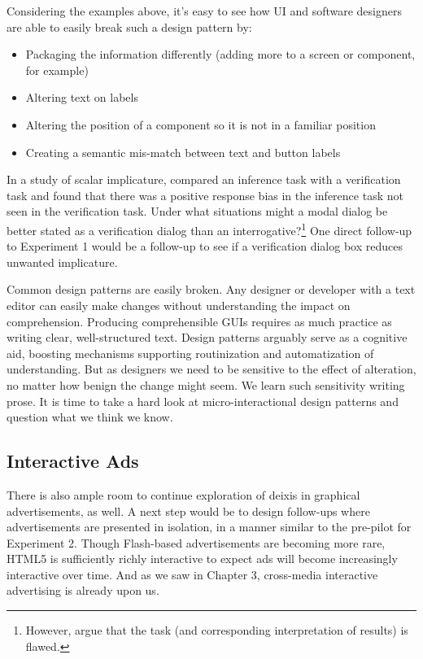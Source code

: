 Considering the examples above, it's easy to see how UI and software designers are able to easily break such a design pattern by:

\begin{itemize}
\item Packaging the information differently (adding more to a screen or component, for example)
\item Altering text on labels
\item Altering the position of a component so it is not in a familiar position
\item Creating a semantic mis-match between text and button labels
\end{itemize}

In a study of scalar implicature,  \citet*{Geurts:2009fw}  compared an inference task with a verification task and found that there was a positive response bias in the inference task not seen in the verification task. Under what situations might a modal dialog be better stated as a verification dialog than an  interrogative?\footnote{However, \citep{CliftonJr:2010dt} argue that the \citet{Geurts:2009fw} task (and corresponding interpretation of results) is flawed.}  One direct follow-up to Experiment 1 would be a follow-up to see if a verification dialog box reduces unwanted implicature.

Common design patterns are easily broken. Any designer or developer with a text editor can easily make changes without understanding the impact on comprehension. Producing comprehensible GUIs requires as much practice as writing clear, well-structured text. Design patterns arguably serve as a cognitive aid, boosting mechanisms supporting routinization and automatization of understanding. But as designers we need to be sensitive to the effect of alteration, no matter how benign the change might seem. We learn such sensitivity writing prose. It is time to take a hard look at micro-interactional design patterns and question what we think we know.

\subsection{Interactive Ads}
\label{interactiveads}

There is also ample room to continue exploration of deixis in graphical advertisements, as well. A next step would be to design follow-ups where advertisements are presented in isolation, in a manner similar to the pre-pilot for Experiment 2. Though Flash-based advertisements are becoming more rare, HTML5 is sufficiently richly interactive to expect ads will become increasingly interactive over time. And as we saw in Chapter 3, cross-media interactive advertising is already upon us.

